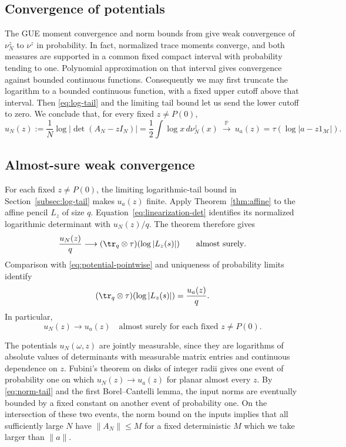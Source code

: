 \subsection{Convergence of potentials}\label{subsec:potentials}

The GUE moment convergence and norm bounds from \cite[pp.~1--2 of arXiv v1]{CGP22} give weak convergence of $\nu_N^z$ to $\nu^z$ in probability.
In fact, normalized trace moments converge, and both measures are supported in a common fixed compact interval with probability tending to one.
Polynomial approximation on that interval gives convergence against bounded continuous functions.
Consequently we may first truncate the logarithm to a bounded continuous function, with a fixed upper cutoff above that interval.
Then \eqref{eq:log-tail} and the limiting tail bound let us send the lower cutoff to zero.
We conclude that, for every fixed $z\ne P(0)$,
\begin{equation}\label{eq:potential-pointwise}
 u_N(z):=\frac1N\log|\det(A_N-zI_N)|
         =\frac12\int\log x\,d\nu_N^z(x)
 \ \xrightarrow{\mathbb P}\
 u_a(z)=\tau(\log|a-z1_{\mathcal M}|).
\end{equation}

\subsection{Almost-sure weak convergence}\label{subsec:brown-as}

For each fixed $z\ne P(0)$, the limiting logarithmic-tail bound in Section~\ref{subsec:log-tail} makes $u_a(z)$ finite.
Apply Theorem~\ref{thm:affine} to the affine pencil $L_z$ of size $q$.
Equation~\eqref{eq:linearization-det} identifies its normalized logarithmic determinant with $u_N(z)/q$.
The theorem therefore gives
\[
 \frac{u_N(z)}q\longrightarrow
 (\tr_q\otimes\tau)(\log|L_z(s)|)
 \qquad\text{almost surely}.
\]
Comparison with \eqref{eq:potential-pointwise} and uniqueness of probability limits identify
\[
 (\tr_q\otimes\tau)(\log|L_z(s)|)=\frac{u_a(z)}q.
\]
In particular,
\[
 u_N(z)\longrightarrow u_a(z)\quad\text{almost surely for each fixed }z\ne P(0).
\]

The potentials $u_N(\omega,z)$ are jointly measurable, since they are logarithms of absolute values of determinants with measurable matrix entries and continuous dependence on $z$.
Fubini's theorem on disks of integer radii gives one event of probability one on which $u_N(z)\to u_a(z)$ for planar almost every $z$.
By \eqref{eq:norm-tail} and the first Borel--Cantelli lemma, the input norms are eventually bounded by a fixed constant on another event of probability one.
On the intersection of these two events, the norm bound on the inputs implies that all sufficiently large $N$ have $\|A_N\|\le M$ for a fixed deterministic $M$ which we take larger than $\|a\|$.


